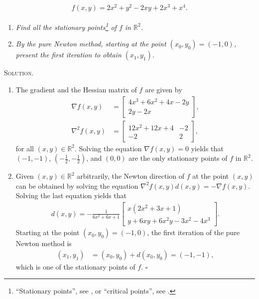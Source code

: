 \documentclass[a4paper]{article}
\numberwithin{equation}{section}
\begin{document}
\begin{align}
f\left( {x,y} \right) = 2{x^2} + {y^2} - 2xy + 2{x^3} + {x^4}.
\end{align}
\begin{enumerate}
\item \textit{Find all the stationary points\footnote{``Stationary points'', see \cite{2}, or ``critical points'', see \cite{1}.} of $f$ in $\mathbb{R}^2$.}
\item \textit{By the pure Newton method, starting at the point $\left(x_0,y_0\right)=\left(-1,0\right)$, present the first iteration to obtain $\left(x_1,y_1\right)$.}
\end{enumerate}
\textsc{Solution.}
\begin{enumerate}
\item The gradient and the Hessian matrix of $f$ are given by
\begin{align}
\nabla f\left( {x,y} \right) &= \left[ {\begin{array}{*{20}{c}}
{4{x^3} + 6{x^2} + 4x - 2y}\\
{2y - 2x}
\end{array}} \right],\\
{\nabla ^2}f\left( {x,y} \right) &= \left[ {\begin{array}{*{20}{c}}
{12{x^2} + 12x + 4}&{ - 2}\\
{ - 2}&2
\end{array}} \right],
\end{align}
for all $\left(x,y\right)\in \mathbb{R}^2$. Solving the equation $\nabla f\left( {x,y} \right) = 0$ yields that $\left( { - 1, - 1} \right)$, $\left( { - \frac{1}{2}, - \frac{1}{2}} \right)$, and $\left( {0,0} \right)$ are the only stationary points of $f$ in $\mathbb{R}^2$.
\item Given $\left(x,y\right)\in \mathbb{R}^2$ arbitrarily, the Newton direction of $f$ at the point $\left(x,y\right)$ can be obtained by solving the equation ${\nabla ^2}f\left( {x,y} \right)d\left( {x,y} \right) =  - \nabla f\left( {x,y} \right)$. Solving the last equation yields that 
\begin{align}
d\left( {x,y} \right) =  - \frac{1}{{6{x^2} + 6x + 1}}\left[ {\begin{array}{*{20}{c}}
{x\left( {2{x^2} + 3x + 1} \right)}\\
{y + 6xy + 6{x^2}y - 3{x^2} - 4{x^3}}
\end{array}} \right].
\end{align}
Starting at the point $\left(x_0,y_0\right)= \left(-1,0\right)$, the first iteration of the pure Newton method is 
\begin{align}
\left( {{x_1},{y_1}} \right) &= \left( {{x_0},{y_0}} \right) + d\left( {{x_0},{y_0}} \right)= \left( { - 1, - 1} \right),
\end{align}
which is one of the stationary points of $f$. \hfill $\square$
\end{enumerate}
\end{document}
